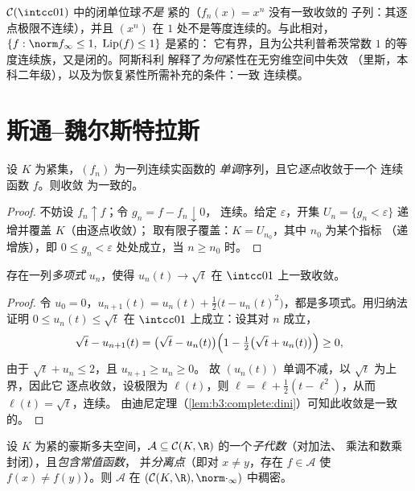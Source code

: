 \begin{example}\label{ex:b3:complete:ascoliexamples}
$\mathcal C(\intcc01)$ 中的闭单位球\emph{不是}
紧的（$f_n(x) = x^n$ 没有一致收敛的
子列：其逐点极限不连续），并且
$(x^n)$ 在 $1$ 处不是等度连续的。与此相对，$\{f : \norm
f_\infty \leq 1,\ \operatorname{Lip}(f) \leq 1\}$ 是紧的：
它有界，且为公共利普希茨常数 $1$ 的等度连续族，又是闭的。阿斯科利
解释了\emph{为何}紧性在无穷维空间中失效
（里斯，本科二年级），以及为恢复紧性所需补充的条件：一致
连续模。
\end{example}

\section{斯通–魏尔斯特拉斯}

\begin{lemma}[迪尼]\label{lem:b3:complete:dini}
设 $K$ 为紧集，$(f_n)$ 为一列连续实函数的
\emph{单调}序列，且它\emph{逐点}收敛于一个
连续函数 $f$。则收敛
为一致的。
\end{lemma}

\begin{proof}
不妨设 $f_n \uparrow f$；令 $g_n = f - f_n \downarrow 0$，
连续。给定 $\varepsilon$，开集 $U_n = \{g_n <
\varepsilon\}$ 递增并覆盖 $K$（由逐点收敛）；
取有限子覆盖：$K = U_{n_0}$，其中 $n_0$ 为某个指标
（递增族），即 $0 \leq g_n < \varepsilon$
处处成立，当 $n \geq n_0$ 时。
\end{proof}

\begin{lemma}\label{lem:b3:complete:sqrt}
存在一列\emph{多项式} $u_n$，使得 $u_n(t) \to
\sqrt t$ 在 $\intcc01$ 上一致收敛。
\end{lemma}

\begin{proof}
令 $u_0 = 0$，$u_{n+1}(t) = u_n(t) + \frac12\bigl(t -
u_n(t)^2\bigr)$，都是多项式。用归纳法证明 $0 \leq u_n(t) \leq
\sqrt t$ 在 $\intcc01$ 上成立：设其对 $n$ 成立，
\[
\sqrt t - u_{n+1}(t) = \bigl(\sqrt t - u_n(t)\bigr)
\Bigl(1 - \tfrac12\bigl(\sqrt t + u_n(t)\bigr)\Bigr) \geq 0,
\]
由于 $\sqrt t + u_n \leq 2$，且 $u_{n+1} \geq u_n \geq 0$。
故 $(u_n(t))$ 单调不减，以 $\sqrt t$ 为上界，因此它
逐点收敛，设极限为 $\ell(t)$，则 $\ell =
\ell + \frac12(t - \ell^2)$，从而 $\ell(t) = \sqrt t$，连续。
由迪尼定理（\cref{lem:b3:complete:dini}）可知此收敛是一致的。
\end{proof}

\begin{theorem}
\label{thm:b3:complete:stoneweierstrass}
设 $K$ 为紧的豪斯多夫空间，$\mathcal A \subseteq
\mathcal C(K, \R)$ 的一个\emph{子代数}（对加法、
乘法和数乘封闭），且\emph{包含常值函数}，
并\emph{分离点}（即对 $x \neq y$，存在 $f \in
\mathcal A$ 使 $f(x) \neq f(y)$）。则 $\mathcal A$ 在
$(\mathcal C(K,\R), \norm\cdot_\infty)$ 中稠密。
\end{theorem}

